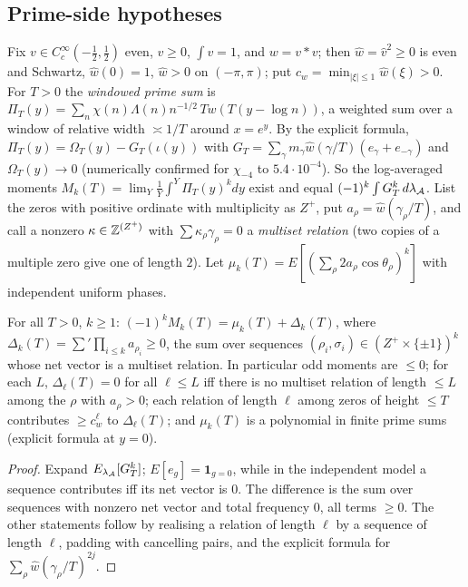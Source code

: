 \subsection{Prime-side hypotheses}\label{sec:prime}
Fix $v\in C_c^\infty(-\frac12,\frac12)$ even, $v\ge0$, $\int v=1$, and $w=v*v$; then $\hat w=\hat v^2\ge0$ is even and Schwartz, $\hat w(0)=1$, $\hat w>0$ on $(-\pi,\pi)$; put $c_w=\min_{|\xi|\le1}\hat w(\xi)>0$. For $T>0$ the \emph{windowed prime sum} is $\Pi_T(y)=\sum_n\chi(n)\Lambda(n)n^{-1/2}\,Tw(T(y-\log n))$, a weighted sum over a window of relative width $\asymp1/T$ around $x=e^y$. By the explicit formula, $\Pi_T(y)=\Omega_T(y)-G_T(\iota(y))$ with $G_T=\sum_\gamma m_\gamma\hat w(\gamma/T)(e_\gamma+e_{-\gamma})$ and $\Omega_T(y)\to0$ (numerically confirmed for $\chi_{-4}$ to $5.4\cdot10^{-4}$). So the log-averaged moments $M_k(T)=\lim_Y\frac1Y\int^Y\Pi_T(y)^kdy$ exist and equal $(-1)^k\int G_T^k\,d\lambda_{\mathcal A}$. List the zeros with positive ordinate with multiplicity as $Z^+$, put $a_\rho=\hat w(\gamma_\rho/T)$, and call a nonzero $\kappa\in\mathbb Z^{(Z^+)}$ with $\sum\kappa_\rho\gamma_\rho=0$ a \emph{multiset relation} (two copies of a multiple zero give one of length $2$). Let $\mu_k(T)=E[(\sum_\rho2a_\rho\cos\theta_\rho)^k]$ with independent uniform phases.

\begin{theorem}\label{thm:P1}
For all $T>0$, $k\ge1$: $(-1)^kM_k(T)=\mu_k(T)+\Delta_k(T)$, where $\Delta_k(T)=\sum'\prod_{i\le k}a_{\rho_i}\ge0$, the sum over sequences $(\rho_i,\sigma_i)\in(Z^+\times\{\pm1\})^k$ whose net vector is a multiset relation. In particular odd moments are $\le0$; for each $L$, $\Delta_\ell(T)=0$ for all $\ell\le L$ iff there is no multiset relation of length $\le L$ among the $\rho$ with $a_\rho>0$; each relation of length $\ell$ among zeros of height $\le T$ contributes $\ge c_w^\ell$ to $\Delta_\ell(T)$; and $\mu_k(T)$ is a polynomial in finite prime sums (explicit formula at $y=0$).
\end{theorem}

\begin{proof}
Expand $E_{\lambda_{\mathcal A}}[G_T^k]$; $E[e_g]=\mathbf 1_{g=0}$, while in the independent model a sequence contributes iff its net vector is $0$. The difference is the sum over sequences with nonzero net vector and total frequency $0$, all terms $\ge0$. The other statements follow by realising a relation of length $\ell$ by a sequence of length $\ell$, padding with cancelling pairs, and the explicit formula for $\sum_\rho\hat w(\gamma_\rho/T)^{2j}$.
\end{proof}


